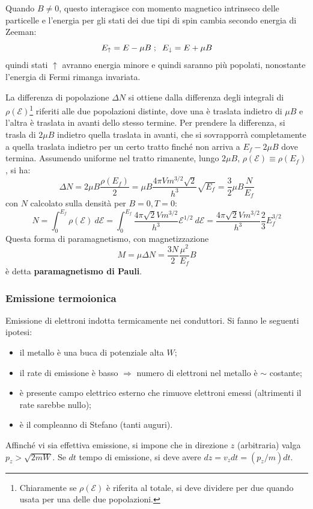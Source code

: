 \documentclass[10pt, a4paper]{scrartcl}
\numberwithin{equation}{subsection}
\theoremstyle{style1}
\theoremstyle{style2}
\begin{document}
Quando $B \neq 0 $, questo interagisce con momento magnetico intrinseco delle particelle e l'energia per gli stati dei due tipi di spin cambia secondo energia di Zeeman:
\[
	E_\uparrow = E - \mu  B \hspace{.1cm} ; \hspace{.2cm} E _\downarrow = E + \mu B
\] 
quindi stati $\uparrow$ avranno energia minore e quindi saranno pi\`u popolati, nonostante l'energia di Fermi rimanga invariata.

La differenza di popolazione $\Delta N$ si ottiene dalla differenza degli integrali di $\rho (\mathscr{E})$\footnote{Chiaramente se $\rho (\mathscr{E})$ \`e riferita al totale, si deve dividere per due quando usata per una delle due popolazioni.} riferiti alle due popolazioni distinte, dove una \`e traslata indietro di $\mu B$ e l'altra \`e traslata in avanti dello stesso termine. 
Per prendere la differenza, si trasla di $2\mu B$ indietro quella traslata in avanti, che si sovrapporr\`a completamente a quella traslata indietro per un certo tratto finch\'e non arriva a $E_f-2\mu B$ dove termina. 
Assumendo uniforme nel tratto rimanente, lungo $2\mu  B$, $\rho (\mathscr{E})\equiv \rho (E_f)$, si ha:
\[
	\Delta N = 2\mu B \frac{\rho (E_f)}{2} =  \mu  B \frac{4\pi Vm^{3 / 2} \sqrt{2} }{h^3}\sqrt{E_f} = \frac{3}{2}\mu B \frac{N}{E_f}
\] 
con $N$ calcolato sulla densit\`a per $B=0 , T=0$:
\[
N = \int_{0} ^{E_f} \rho  (\mathscr{E}) \ d \mathscr{E} = \int_{0} ^{E_f} \frac{4\pi \sqrt{2} V m^{3 / 2} }{h^3} \mathscr{E}^{1 / 2}  \ d \mathscr{E} = \frac{4\pi \sqrt{2} V m^{3/2} }{h^3} \frac{2}{3} E_f^{ 3 / 2} 
\] 
Questa forma di paramagnetismo, con magnetizzazione
\begin{equation}
	M = \mu  \Delta N = \frac{3N}{2} \frac{\mu ^2}{E_f}B
\end{equation}
\`e detta \textbf{paramagnetismo di Pauli}.

\subsubsection{Emissione termoionica}

Emissione di elettroni indotta termicamente nei conduttori. Si fanno le seguenti ipotesi:
\begin{itemize}
	\item il metallo \`e una buca di potenziale alta $W$;
	\item il rate di emissione \`e basso $\Rightarrow $ numero di elettroni nel metallo \`e $\sim$ costante;
	\item \`e presente campo elettrico esterno che rimuove elettroni emessi (altrimenti il rate sarebbe nullo);
	\item \`e il compleanno di Stefano (tanti auguri).
\end{itemize}
Affinch\'e vi sia effettiva emissione, si impone che in direzione $z$ (arbitraria) valga $p_z > \sqrt{2m W} $. 
Se $dt$ tempo di emissione, si deve avere $dz = v_z dt = (p_z / m) dt$.
\end{document}

